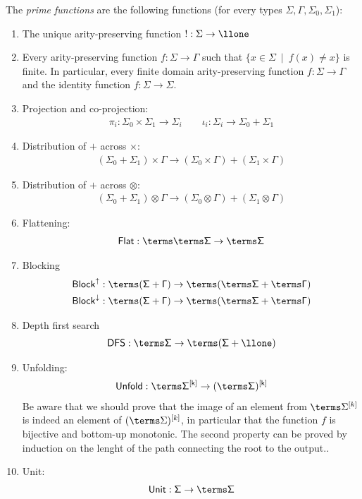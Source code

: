 \begin{definition}\label{def:prime-functions} The \emph{prime functions} are the following functions (for every types $\Sigma,\Gamma,\Sigma_0,\Sigma_1$): 
\begin{enumerate}
    \item The unique arity-preserving function $! : \Sigma \to \llone$
    \item Every arity-preserving function $f : \Sigma \to \Gamma$ such that    $\{x \in \Sigma \ \mid \ f(x)\neq x\}$ is finite. In particular, every finite domain arity-preserving function $f : \Sigma \to \Gamma$ and the identity function $f : \Sigma \to \Sigma$.
    \item Projection and co-projection:
    \begin{align*}
        \pi_i : \Sigma_0 \times \Sigma_1 \to \Sigma_i \qquad \iota_i : \Sigma_i \to \Sigma_0 + \Sigma_1
    \end{align*}
    \item Distribution of $+$ across $\times$:
\begin{align*}
    (\Sigma_0 + \Sigma_1 ) \times \Gamma \to (\Sigma_0 \times \Gamma) + (\Sigma_1 \times \Gamma)
\end{align*}
\item Distribution of $+$ across $\otimes$:
\begin{align*}
    (\Sigma_0 + \Sigma_1 ) \otimes \Gamma \to (\Sigma_0 \otimes \Gamma) + (\Sigma_1 \otimes \Gamma)
\end{align*}
\item Flattening:
\begin{align*}
    \sf{Flat}: \terms \terms \Sigma \to \terms \Sigma
\end{align*}
\item Blocking
    \begin{align*}
        \sf{Block}^{\uparrow}:\terms (\Sigma + \Gamma) \to \terms (\terms \Sigma + \terms \Gamma)\\
        \sf{Block}^{\downarrow}:\terms (\Sigma + \Gamma) \to \terms (\terms \Sigma + \terms \Gamma)
    \end{align*}
    \item Depth first search
    \begin{align*}
        \sf{DFS}:\terms \Sigma \to \terms (\Sigma+\llone)
    \end{align*}
    \item Unfolding: 
\begin{align*}
    \sf{Unfold}:\terms \Sigma^{[k]} \to (\terms \Sigma)^{[k]}
\end{align*}
Be aware that we should prove that the image of an element from $\terms \Sigma^{[k]}$ is indeed an element of $(\terms \Sigma)^{[k]}$, in particular that the function $f$ is bijective and bottom-up monotonic. The second property can be proved by induction on the lenght of the path connecting the root to the output..
    \item Unit:
\begin{align*}
    \sf{Unit}:\Sigma  \to \terms \Sigma
\end{align*}


\end{enumerate}
\end{definition}
